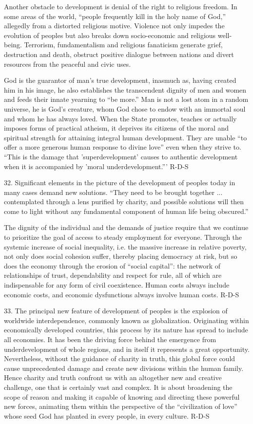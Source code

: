 \documentclass[oneside]{book}
\begin{document}
Another obstacle to development is denial of the right to religious freedom. In
some areas of the world, ``people frequently kill in the holy name of God,''
allegedly from a distorted religious motive. Violence not only impedes the
evolution of peoples but also breaks down socio-economic and religious
well-being. Terrorism, fundamentalism and religious fanaticism generate grief,
destruction and death, obstruct positive dialogue between nations and divert
resources from the peaceful and civic uses.

God is the guarantor of man's true development, inasmuch as, having created him
in his image, he also establishes the transcendent dignity of men and women and
feeds their innate yearning to ``be more.'' Man is not a lost atom in a random
universe, he is God's creature, whom God chose to endow with an immortal soul
and whom he has always loved. When the State promotes, teaches or actually
imposes forms of practical atheism, it deprives its citizens of the moral and
spiritual strength for attaining integral human development. They are unable
``to offer a more generous human response to divine love'' even when they strive
to. ``This is the damage that 'superdevelopment' causes to authentic development
when it is accompanied by 'moral underdevelopment.'''
R-D-S

32. Significant elements in the picture of the development of peoples today in
many cases demand new solutions. ``They need to be brought together
... contemplated through a lens purified by charity, and possible solutions will
then come to light without any fundamental component of human life being
obscured.''

The dignity of the individual and the demands of justice require that we
continue to prioritize the goal of access to steady employment for
everyone. Through the systemic increase of social inequality, i.e. the massive
increase in relative poverty, not only does social cohesion suffer, thereby
placing democracy at risk, but so does the economy through the erosion of
``social capital'': the network of relationships of trust, dependability and
respect for rule, all of which are indispensable for any form of civil
coexistence. Human costs always include economic costs, and economic
dysfunctions always involve human costs.
R-D-S

33. The principal new feature of development of peoples is the explosion of
worldwide interdependence, commonly known as globalization. Originating within
economically developed countries, this process by its nature has spread to
include all economies. It has been the driving force behind the emergence from
underdevelopment of whole regions, and in itself it represents a great
opportunity. Nevertheless, without the guidance of charity in truth, this global
force could cause unprecedented damage and create new divisions within the human
family. Hence charity and truth confront us with an altogether new and creative
challenge, one that is certainly vast and complex. It is about broadening the
scope of reason and making it capable of knowing and directing these powerful
new forces, animating them within the perspective of the ``civilization of
love'' whose seed God has planted in every people, in every culture.
R-D-S
\end{document}
